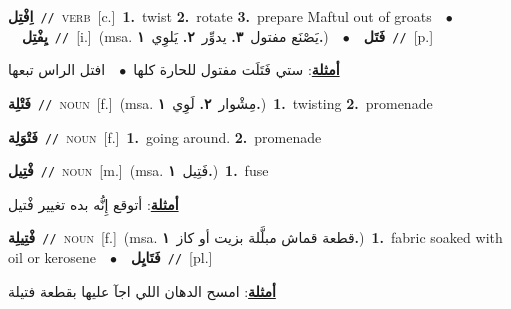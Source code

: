 \documentclass[10pt,a4paper,twoside]{article} %
\begin{document}
\begin{multicols}{2}
{{{{{{\setlength\topsep{0pt}\textbf{\foreignlanguage{arabic}{اِفْتِل}}\ {\color{gray}\texttt{//}\color{black}}\ \textsc{verb}\ [c.]\ \textbf{1.}~twist  \textbf{2.}~rotate  \textbf{3.}~prepare Maftul out of groats\ \ $\bullet$\ \ \setlength\topsep{0pt}\textbf{\foreignlanguage{arabic}{يِفْتِل}}\ {\color{gray}\texttt{//}\color{black}}\ [i.]\ \color{gray}(msa. \foreignlanguage{arabic}{يَصْنَع مفتول}~\foreignlanguage{arabic}{\textbf{٣.}}  \foreignlanguage{arabic}{يدوِّر}~\foreignlanguage{arabic}{\textbf{٢.}}  \foreignlanguage{arabic}{يَلوِي}~\foreignlanguage{arabic}{\textbf{١.}})\color{black}\ \ $\bullet$\ \ \setlength\topsep{0pt}\textbf{\foreignlanguage{arabic}{فَتَل}}\ {\color{gray}\texttt{//}\color{black}}\ [p.]\  \begin{flushright}\color{gray}\foreignlanguage{arabic}{\textbf{\underline{\foreignlanguage{arabic}{أمثلة}}}: ستي فَتَلَت مفتول للحارة كلها\ $\bullet$\ \  افتل الراس تبعها}\end{flushright}\color{black}} \vspace{2mm}

{\setlength\topsep{0pt}\textbf{\foreignlanguage{arabic}{فَتْلِة}}\ {\color{gray}\texttt{//}\color{black}}\ \textsc{noun}\ [f.]\ \color{gray}(msa. \foreignlanguage{arabic}{مِشْوار}~\foreignlanguage{arabic}{\textbf{٢.}}  \foreignlanguage{arabic}{لَوِي}~\foreignlanguage{arabic}{\textbf{١.}})\color{black}\ \textbf{1.}~twisting  \textbf{2.}~promenade\ 

{\setlength\topsep{0pt}\textbf{\foreignlanguage{arabic}{فَتْوَلِة}}\ {\color{gray}\texttt{//}\color{black}}\ \textsc{noun}\ [f.]\ \textbf{1.}~going around.  \textbf{2.}~promenade\ 

{\setlength\topsep{0pt}\textbf{\foreignlanguage{arabic}{فْتِيل}}\ {\color{gray}\texttt{//}\color{black}}\ \textsc{noun}\ [m.]\ \color{gray}(msa. \foreignlanguage{arabic}{فَتِيل}~\foreignlanguage{arabic}{\textbf{١.}})\color{black}\ \textbf{1.}~fuse\  \begin{flushright}\color{gray}\foreignlanguage{arabic}{\textbf{\underline{\foreignlanguage{arabic}{أمثلة}}}: أتوقع إِنُّه بده تغيير فْتيل}\end{flushright}\color{black}} \vspace{2mm}

{\setlength\topsep{0pt}\textbf{\foreignlanguage{arabic}{فْتِيلِة}}\ {\color{gray}\texttt{//}\color{black}}\ \textsc{noun}\ [f.]\ \color{gray}(msa. \foreignlanguage{arabic}{قطعة قماش مبلَّلة بزيت أو كاز}~\foreignlanguage{arabic}{\textbf{١.}})\color{black}\ \textbf{1.}~fabric soaked with oil or kerosene\ \ $\bullet$\ \ \setlength\topsep{0pt}\textbf{\foreignlanguage{arabic}{فَتَايِل}}\ {\color{gray}\texttt{//}\color{black}}\ [pl.]\  \begin{flushright}\color{gray}\foreignlanguage{arabic}{\textbf{\underline{\foreignlanguage{arabic}{أمثلة}}}: امسح الدهان اللي اجآ عليها بقطعة فتيلة}\end{flushright}\color{black}} \vspace{2mm}

}}}}}}}
\end{multicols}
\end{document}
